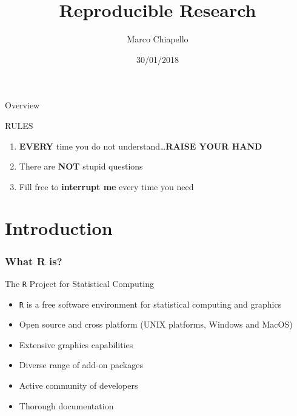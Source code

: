 \documentclass{beamer}
\title[Short title]{Reproducible Research}
\author{Marco Chiapello}
\institute[] 
{
\medskip
\textit{chiapello.m@gmail.com} 
}
\date{30/01/2018}
\begin{document}

\newlength{\fancyvrbtopsep}
\newlength{\fancyvrbpartopsep}
\makeatletter
\FV@AddToHook{\FV@ListParameterHook}{\topsep=\fancyvrbtopsep\partopsep=\fancyvrbpartopsep}
\makeatother
\setlength{\fancyvrbtopsep}{-3pt}
\setlength{\fancyvrbpartopsep}{-3pt}

\begin{frame}
	\titlepage 
\end{frame}

\begin{frame}{Overview}
	\small
	\tableofcontents
\end{frame}

\begin{frame}
	\centering \LARGE RULES
	\begin{enumerate}
		\small
		\item \textbf{EVERY} time you do not understand\ldots\textbf{RAISE YOUR HAND}
		\item There are \textbf{NOT} stupid questions
		\item Fill free to \textbf{interrupt me} every time you need
	\end{enumerate}
\end{frame}


\section{Introduction}

\begin{frame}
	\frametitle{What R is?}
	\Large The \texttt{R} Project for Statistical Computing
	\begin{itemize}
		\small
		\item \texttt{R} is a free software environment for statistical computing and graphics
		\item Open source and cross platform (UNIX platforms, Windows and MacOS)
		\item Extensive graphics capabilities
		\item Diverse range of add-on packages
		\item Active community of developers
		\item Thorough documentation
	\end{itemize}
\end{frame}
\end{document}
